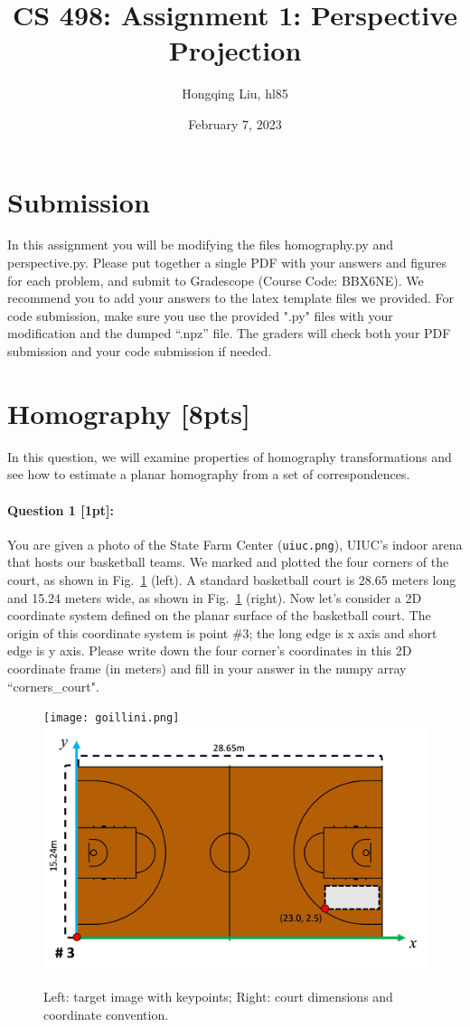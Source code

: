 \documentclass[11pt]{article}
\begin{document}
\author{Hongqing Liu, hl85}
\title{CS 498: Assignment 1: Perspective Projection}
\date{February 7, 2023}
\maketitle

\medskip


\section*{Submission}

In this assignment you will be modifying the files homography.py and perspective.py.
Please put together a single PDF with your answers and figures for each problem, and submit to Gradescope (Course Code: BBX6NE). We recommend you to add your answers to the latex template files we provided. For code submission, make sure you use the provided ".py" files with your modification and the dumped ``.npz'' file. The graders will check both your PDF submission and your code submission if needed. 


\section*{Homography [8pts]}

In this question, we will examine properties of homography transformations and see how to estimate a planar homography from a set of correspondences. 

\paragraph{Question 1 [1pt]:} You are given a photo of the State Farm Center (\texttt{uiuc.png}), UIUC's indoor arena that hosts our basketball teams. We marked and plotted the four corners of the court, as shown in Fig.~\ref{fig:intro} (left). A standard basketball court is 28.65 meters long and 15.24 meters wide, as shown in Fig.~\ref{fig:intro} (right). Now let's consider a 2D coordinate system defined on the planar surface of the basketball court. The origin of this coordinate system is point \#3; the long edge is x axis and short edge is y axis. Please write down the four corner's coordinates in this 2D coordinate frame (in meters) and fill in your answer in the numpy array ``corners\_court". 

\begin{figure}[htbp]
\small
\texttt{[image: goillini.png]}
\includegraphics[width=0.5\linewidth]{coordinate.png}
\caption{ Left: target image with keypoints; Right: court dimensions and coordinate convention.}
\label{fig:intro}
\end{figure}
\end{document}
